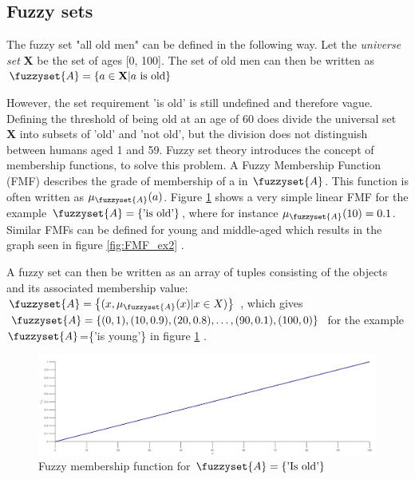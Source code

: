 \subsection{Fuzzy sets}
The fuzzy set "all old men" can be defined in the following way. Let the \textit{universe set} \textbf{X} be the set of ages [0, 100]. The set of old men can then be written as
$\fuzzyset{A}=\left \{ a \in \textbf{X} | a \text{ is old} \right \}$
\cite{chen2000introduction}

However, the set requirement 'is old' is still undefined and therefore vague. Defining the threshold of being old at an age of 60 does divide the universal set \textbf{X} into subsets of 'old' and 'not old', but the division does not distinguish between humans aged 1 and 59.
Fuzzy set theory introduces the concept of membership functions, to solve this problem. A Fuzzy Membership Function (FMF) describes the grade of membership of a  in  $\fuzzyset{A}$. This function is often written as $\mu_{\fuzzyset{A}}(a)$. Figure \ref{fig:FMF_ex} shows a very simple linear FMF for the example $\fuzzyset{A}=\left \{\text{'is old'} \right \}$, where for instance $\mu_{\fuzzyset{A}}(10)=0.1$. Similar FMFs can be defined for young and middle-aged which results in the graph seen in figure \ref{fig:FMF_ex2} \cite{ross2009fuzzy}.

A fuzzy set can then be written as an array of tuples consisting of the objects and its associated membership value: $\fuzzyset{A}=\left \{(x,\mu_{\fuzzyset{A}}(x)|x \in X) \right \}$ \cite{zimmermann2010fuzzy}, which gives \\ $\fuzzyset{A}=\left \{(0,1),(10,0.9),(20,0.8),\dots,(90,0.1),(100,0) \right \}$ for the example $\fuzzyset{A}$=\{'is young'\} in figure \ref{fig:FMF_ex} \cite{ross2009fuzzy}.
\begin{figure}
    \centering
    \includegraphics[width=\textwidth]{FMF_ex}
    \caption{Fuzzy membership function for $\protect\fuzzyset{A}=\left \{ \text{'Is old'} \right \}$}
    \label{fig:FMF_ex}
\end{figure}

